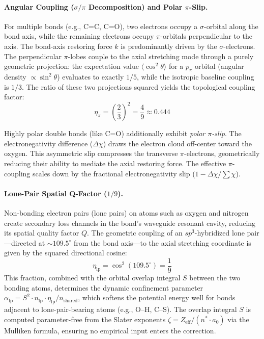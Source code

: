 \paragraph{Angular Coupling ($\sigma/\pi$ Decomposition) and Polar $\pi$-Slip.}
For multiple bonds (e.g., C=C, C=O), two electrons occupy a $\sigma$-orbital along the bond axis, while the remaining electrons occupy $\pi$-orbitals perpendicular to the axis. The bond-axis restoring force $k$ is predominantly driven by the $\sigma$-electrons. The perpendicular $\pi$-lobes couple to the axial stretching mode through a purely geometric projection: the expectation value $\langle\cos^2\theta\rangle$ for a $p_\pi$ orbital (angular density $\propto \sin^2\theta$) evaluates to exactly $1/5$, while the isotropic baseline coupling is $1/3$. The ratio of these two projections squared yields the topological coupling factor:
\begin{equation}
    \eta_\pi = \left(\frac{2}{3}\right)^2 = \frac{4}{9} \approx 0.444
    \label{eq:pi_coupling}
\end{equation}

Highly polar double bonds (like C=O) additionally exhibit \emph{polar $\pi$-slip}. The electronegativity difference ($\Delta \chi$) draws the electron cloud off-center toward the oxygen. This asymmetric slip compresses the transverse $\pi$-electrons, geometrically reducing their ability to mediate the axial restoring force. The effective $\pi$-coupling scales down by the fractional electronegativity slip ($1 - \Delta \chi / \sum \chi$).

\paragraph{Lone-Pair Spatial Q-Factor ($1/9$).}
Non-bonding electron pairs (lone pairs) on atoms such as oxygen and nitrogen create secondary loss channels in the bond's waveguide resonant cavity, reducing its spatial quality factor $Q$. The geometric coupling of an $sp^3$-hybridized lone pair---directed at $\sim 109.5^\circ$ from the bond axis---to the axial stretching coordinate is given by the squared directional cosine:
\begin{equation}
    \eta_{\text{lp}} = \cos^2(109.5^\circ) = \frac{1}{9}
    \label{eq:lp_qfactor}
\end{equation}
This fraction, combined with the orbital overlap integral $S$ between the two bonding atoms, determines the dynamic confinement parameter $\alpha_{\text{lp}} = S^2 \cdot n_{\text{lp}} \cdot \eta_{\text{lp}} / n_{\text{shared}}$, which softens the potential energy well for bonds adjacent to lone-pair-bearing atoms (e.g., O--H, C--S). The overlap integral $S$ is computed parameter-free from the Slater exponents $\zeta = Z_{\text{eff}} / (n^* \cdot a_0)$ via the Mulliken formula, ensuring no empirical input enters the correction.

